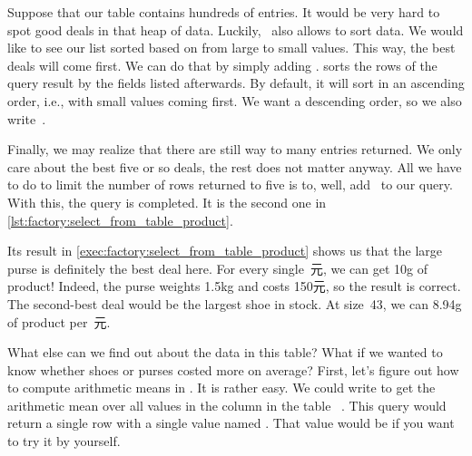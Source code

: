%
%
Suppose that our table  contains hundreds of entries.
It would be very hard to spot good deals in that heap of data.
Luckily, \sql\ also allows to sort data.
We would like to see our list sorted based on  from large to small values.
This way, the best deals will come first.
We can do that by simply adding .
 sorts the rows of the query result by the fields listed afterwards.
By default, it will sort in an ascending order, i.e., with small values coming first.
We want a descending order, so we also write~.

Finally, we may realize that there are still way to many entries returned.
We only care about the best five or so deals, the rest does not matter anyway.
All we have to do to limit the number of rows returned to five is to, well, add~ to our query.
With this, the query is completed.
It is the second one in \cref{lst:factory:select_from_table_product}.

Its result in \cref{exec:factory:select_from_table_product} shows us that the large purse is definitely the best deal here.
For every single~元, we can get 10g of product!
Indeed, the purse weights 1.5kg and costs 150元, so the result is correct.
The second-best deal would be the largest shoe in stock.
At size~43, we can 8.94g of product per~元.

What else can we find out about the data in this table?
What if we wanted to know whether shoes or purses costed more on average?
First, let's figure out how to compute arithmetic means in \sql.
It is rather easy.
We could write  to get the arithmetic mean over all values in the column  in the table ~\cite{PGDG:PD:AF}.
This query would return a single row with a single value named .
That value would be  if you want to try it by yourself.

